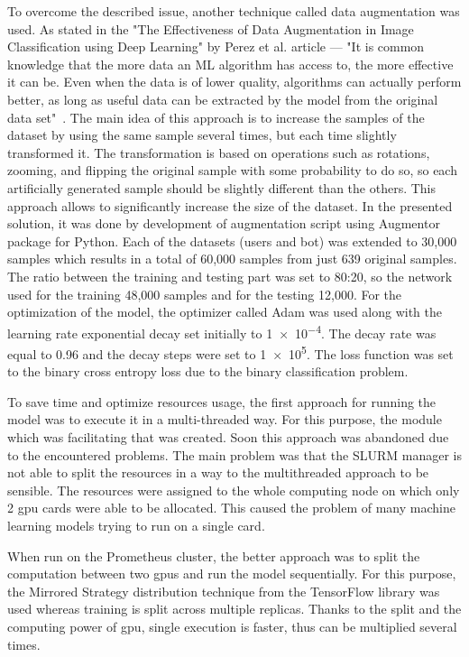 To overcome the described issue, another technique called data augmentation was used.
As stated in the "The Effectiveness of Data Augmentation in Image Classification using Deep Learning" by Perez et al. article --- "It is common knowledge that the more data an ML algorithm has access to, the more effective it can be.
Even when the data is of lower quality, algorithms can actually perform better, as long as useful data can be extracted by the model from the original data set"~\cite{augmentation}.
The main idea of this approach is to increase the samples of the dataset by using the same sample several times, but each time slightly transformed it.
The transformation is based on operations such as rotations, zooming, and flipping the original sample with some probability to do so, so each artificially generated sample should be slightly different than the others.
This approach allows to significantly increase the size of the dataset.
In the presented solution, it was done by development of augmentation script using Augmentor package for Python.
Each of the datasets (users and bot) was extended to 30,000 samples which results in a total of 60,000 samples from just 639 original samples.
The ratio between the training and testing part was set to 80:20, so the network used for the training 48,000 samples and for the testing 12,000.
For the optimization of the model, the optimizer called Adam was used along with the learning rate exponential decay set initially to \num{1e-4}.
The decay rate was equal to 0.96 and the decay steps were set to \num{1e5}.
The loss function was set to the binary cross entropy loss due to the binary classification problem.

To save time and optimize resources usage, the first approach for running the model was to execute it in a multi-threaded way.
For this purpose, the module which was facilitating that was created.
Soon this approach was abandoned due to the encountered problems.
The main problem was that the SLURM manager is not able to split the resources in a way to the multithreaded approach to be sensible.
The resources were assigned to the whole computing node on which only 2 \gls{gpu} cards were able to be allocated.
This caused the problem of many machine learning models trying to run on a single card.

When run on the Prometheus cluster, the better approach was to split the computation between two \gls{gpu}s and run the model sequentially.
For this purpose, the Mirrored Strategy distribution technique from the TensorFlow library was used whereas training is split across multiple replicas.
Thanks to the split and the computing power of \gls{gpu}, single execution is faster, thus can be multiplied several times.
